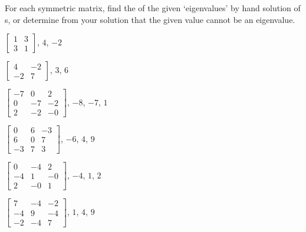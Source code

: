 \begin{exercise} 
For each symmetric matrix, find the  of the given `eigenvalues' by hand solution of s, or determine from your solution that the given value cannot be an eigenvalue.
\begin{Parts}
\item \(\begin{bmatrix} 1&3\\3&1 \end{bmatrix}\), \(4\), \(-2\)

\item \(\begin{bmatrix} 4&-2\\-2&7 \end{bmatrix}\), \(3\), \(6\)

\item \(\begin{bmatrix} -7 & 0 & 2
\\ 0 & -7 & -2
\\ 2 & -2 & -0 \end{bmatrix}\), \(-8\), \(-7\), \(1\)

\item \(\begin{bmatrix} 0 & 6 & -3
\\ 6 & 0 & 7
\\ -3 & 7 & 3 \end{bmatrix}\), \(-6\), \(4\), \(9\)

\begin{reduce}
\item \(\begin{bmatrix} 0 & -4 & 2
\\ -4 & 1 & -0
\\ 2 & -0 & 1 \end{bmatrix}\), \(-4\), \(1\), \(2\)

\item \(\begin{bmatrix} 7 & -4 & -2
\\ -4 & 9 & -4
\\ -2 & -4 & 7 \end{bmatrix}\), \(1\), \(4\), \(9\)
\end{reduce}
\end{Parts}
\end{exercise}



